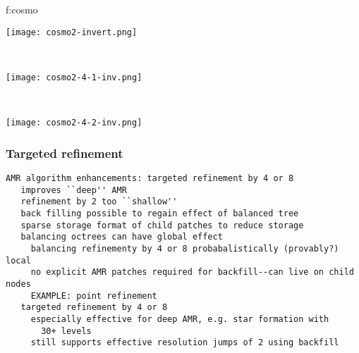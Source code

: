 \documentclass{article}
\begin{document}


{f:cosmo}{
\begin{minipage}{7.0in}
\begin{minipage}{2.2in}
\texttt{[image: cosmo2-invert.png]}
\end{minipage} \ 
\begin{minipage}{2.2in}
\texttt{[image: cosmo2-4-1-inv.png]}
\end{minipage} \ 
\begin{minipage}{2.2in}
\texttt{[image: cosmo2-4-2-inv.png]}
\end{minipage}
\end{minipage}
}

\subsubsection{Targeted refinement} \label{sss:targeted-refinement}

\begin{verbatim}
AMR algorithm enhancements: targeted refinement by 4 or 8
   improves ``deep'' AMR
   refinement by 2 too ``shallow''
   back filling possible to regain effect of balanced tree
   sparse storage format of child patches to reduce storage 
   balancing octrees can have global effect
     balancing refinementy by 4 or 8 probabalistically (provably?) local
     no explicit AMR patches required for backfill--can live on child nodes 
     EXAMPLE: point refinement
   targeted refinement by 4 or 8
     especially effective for deep AMR, e.g. star formation with
       30+ levels
     still supports effective resolution jumps of 2 using backfill
\end{verbatim}
\end{document}
